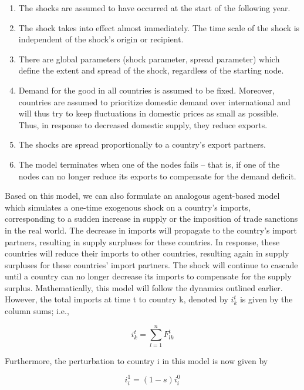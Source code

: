 \documentclass[12pt,letterpaper]{report}
\begin{document}
	\begin{enumerate}
		\item The shocks are assumed to have occurred at the start of the following year.
		\item The shock takes into effect almost immediately. The time scale of the shock is independent of the shock's origin or recipient.
		\item There are global parameters (shock parameter, spread parameter) which define the extent and spread of the shock, regardless of the starting node.
		\item Demand for the good in all countries is assumed to be fixed. Moreover, countries are assumed to prioritize domestic demand over international and will thus try to keep fluctuations in domestic prices as small as possible. Thus, in response to decreased domestic supply, they reduce exports.
		\item The shocks are spread proportionally to a country's export partners.  
		\item The model terminates when one of the nodes fails – that is, if one of the nodes can no longer reduce its exports to compensate for the demand deficit.  
	\end{enumerate}
	
	Based on this model, we can also formulate an analogous agent-based model which simulates a one-time exogenous shock on a country’s imports, corresponding to a sudden increase in supply or the imposition of trade sanctions in the real world. The decrease in imports will propagate to the country’s import partners, resulting in supply surpluses for these countries. In response, these countries will reduce their imports to other countries, resulting again in supply surpluses for these countries’ import partners. The shock will continue to cascade until a country can no longer decrease its imports to compensate for the supply surplus. 
	Mathematically, this model will follow the dynamics outlined earlier. However, the total imports at time t to country k, denoted by $i_{k}^{t}$ is given by the column sums; i.e.,
	
	\begin{equation}
	\label{eqn:327imports} i_{k}^{t} = \sum_{l = 1}^{n} F_{lk}^{t}
	\end{equation}
	
	Furthermore, the perturbation to country i in this model is now given by
	
	\begin{equation}
	\label{eqn:328importShock} i_{i}^{1} = (1 - s) i_{i}^{0}
	\end{equation}
	
\end{document}
